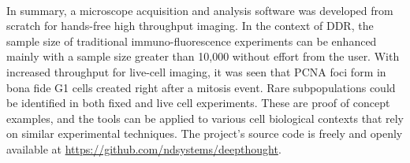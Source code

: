 \paragraph*{} In summary, a microscope acquisition and analysis software was developed from scratch for hands-free high throughput imaging. In the context of DDR, the sample size of traditional immuno-fluorescence experiments can be enhanced mainly with a sample size greater than 10,000 without effort from the user. With increased throughput for live-cell imaging, it was seen that PCNA foci form in bona fide G1 cells created right after a mitosis event. Rare subpopulations could be identified in both fixed and live cell experiments. These are proof of concept examples, and the tools can be applied to various cell biological contexts that rely on similar experimental techniques. The project's source code is freely and openly available at \url{https://github.com/ndsystems/deepthought}. 


